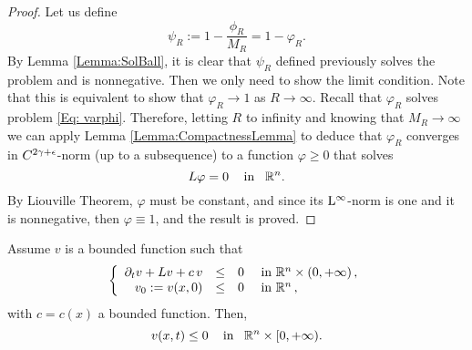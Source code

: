 \begin{proof}
Let us define
$$ \psi_R := 1-\frac{\phi_R}{M_R} = 1-\varphi_R. $$
By Lemma \ref{Lemma:SolBall}, it is clear that $\psi_R$ defined previously solves the problem and is nonnegative. Then we only need to show the limit condition. Note that this is equivalent to show that $\varphi_R \to 1$ as $R\to\infty$. Recall that $\varphi_R$ solves problem \eqref{Eq: varphi}. Therefore, letting $R$ to infinity and knowing that $M_R\to \infty$ we can apply Lemma \ref{Lemma:CompactnessLemma} to deduce that $\varphi_R$ converges in  $C^{2\gamma+\epsilon}$-norm (up to a subsequence) to a function $\varphi\geq 0$ that solves
$$ L\varphi = 0 \,\,\,\,\, \text{ in } \,\,\, \mathbb{R}^n. $$
By Liouville Theorem, $\varphi$ must be constant, and since its $\mathrm{L}^{\infty}$-norm is one and it is nonnegative, then $\varphi\equiv 1$, and the result is proved.
\end{proof}

\begin{theorem}
\label{Th:ParaMaxPrp}
Assume $v$ is a bounded function such that
\begin{equation*}
\left\{\begin{array}{rcll}
\partial_t v + L v + c\,v &\leq& 0 & \textrm{ in }\mathbb{R}^n\times(0,+\infty)\,,\\
v_0:=v(x,0) &\leq& 0 & \textrm{ in } \mathbb{R}^n\,,
\end{array} \right.
\end{equation*}
with $c=c(x)$ a bounded function. Then,
$$ v(x,t) \leq 0 \,\,\,\,\,\text{ in } \,\,\, \mathbb{R}^n\times[0,+\infty). $$
\end{theorem}

